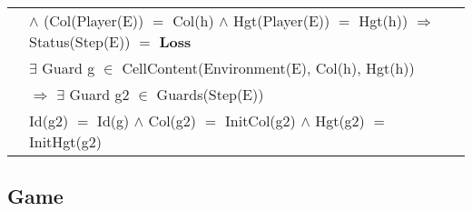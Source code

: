 \documentclass[8pt]{article}
\begin{document}
{\begin{longtable}{rl}
  & \quad\quad\quad\quad $\land$ (\textrm{Col(Player(E))} $=$ \textrm{Col(h)} $\land$ \textrm{Hgt(Player(E))} $=$ \textrm{Hgt(h)}) $\Rightarrow$ \textrm{Status(Step(E))} $=$ \textbf{Loss}\\
  & \quad\quad\quad\quad $\exists$ \textrm{Guard} g $\in$ \textrm{CellContent(Environment(E), Col(h), Hgt(h))}\\
  & \quad\quad\quad\quad\quad\quad $\Rightarrow$ $\exists$ \textrm{Guard} g2 $\in$ \textrm{Guards(Step(E))}\\
  & \quad\quad\quad\quad\quad\quad\quad \textrm{Id(g2)} $=$ \textrm{Id(g)} $\land$ \textrm{Col(g2)} $=$ \textrm{InitCol(g2)} $\land$ \textrm{Hgt(g2)} $=$ \textrm{InitHgt(g2)}\\
\end{longtable}}

\subsection{Game}
\end{document}
